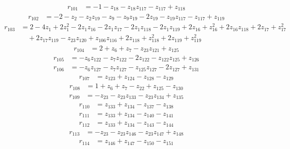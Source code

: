 \begin{align*}
r_{101} &= -1 - z_{18} - z_{18}z_{117} - z_{117} + z_{118}
\end{align*}
\begin{align*}
r_{102} &= -2 - z_{2} - z_{2}z_{19} - z_{9} - z_{9}z_{19} - 2z_{19} - z_{19}z_{117} - z_{117} + z_{119}
\end{align*}
\begin{align*}
r_{103} &= 2 - 4z_{1} + 2z_{1}^{2} - 2z_{1}z_{16} - 2z_{1}z_{17} - 2z_{1}z_{118} - 2z_{1}z_{119} + 2z_{16} + z_{16}^{2} + 2z_{16}z_{118} + 2z_{17} + z_{17}^{2} \\
&\quad  + 2z_{17}z_{119} - z_{23}z_{120} + z_{106}z_{116} + 2z_{118} + z_{118}^{2} + 2z_{119} + z_{119}^{2}
\end{align*}
\begin{align*}
r_{104} &= 2 + z_{6} + z_{7} - z_{23}z_{121} + z_{125}
\end{align*}
\begin{align*}
r_{105} &= -z_{6}z_{122} - z_{7}z_{122} - 2z_{122} - z_{122}z_{125} + z_{126}
\end{align*}
\begin{align*}
r_{106} &= -z_{6}z_{127} - z_{7}z_{127} - z_{125}z_{127} - 2z_{127} + z_{131}
\end{align*}
\begin{align*}
r_{107} &= z_{123} + z_{124} - z_{128} - z_{129}
\end{align*}
\begin{align*}
r_{108} &= 1 + z_{6} + z_{7} - z_{22} + z_{125} - z_{130}
\end{align*}
\begin{align*}
r_{109} &= -z_{23} - z_{23}z_{133} - z_{23}z_{134} + z_{135}
\end{align*}
\begin{align*}
r_{110} &= z_{133} + z_{134} - z_{137} - z_{138}
\end{align*}
\begin{align*}
r_{111} &= z_{133} + z_{134} - z_{140} - z_{141}
\end{align*}
\begin{align*}
r_{112} &= z_{133} + z_{134} - z_{143} - z_{144}
\end{align*}
\begin{align*}
r_{113} &= -z_{23} - z_{23}z_{146} - z_{23}z_{147} + z_{148}
\end{align*}
\begin{align*}
r_{114} &= z_{146} + z_{147} - z_{150} - z_{151}
\end{align*}

